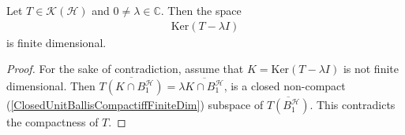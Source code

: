\begin{lemma}
  \label{EigenSpaceisFiniteDim}
  Let $T \in \mathcal{K}(\mathcal{H})$ and $0 \neq \lambda \in \mathbb{C}$.
  Then the space
  \begin{align*}
    \textrm{Ker}(T - \lambda I)
  \end{align*}
  is finite dimensional.
\end{lemma}
\begin{proof}
  For the sake of contradiction, assume that $K = \textrm{Ker}(T -
  \lambda I)$ is not finite dimensional. Then $\overline{T(K \cap
  B_1^\mathcal{H})} = \lambda \overline{K \cap B_1^\mathcal{H}}$, is
  a closed non-compact
  (\autoref{ClosedUnitBallisCompactiffFiniteDim}) subspace of
  $\overline{ T(B_1^\mathcal{H})}$. This contradicts the compactness of $T$.
\end{proof}

